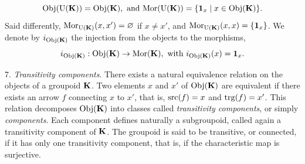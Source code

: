 \begin{article}
  $$%
  \Obj(\Units{\KK}) = \Obj(\KK), \text{ and } \Mor(\Units{\KK}) = \{\id_x \mid x \in \Obj(\KK)\}.
  $$%
  Said differently,
  ${\operatorname{Mor}}_{{\operatorname{U}({\mathbf K})}}(x,x') = \varnothing$ if $x \neq x'$,
  and ${\operatorname{Mor}}_{{\operatorname{U}({\mathbf K})}}(x,x) = \{{\bf 1}_x\}$.
  We denote by $i_{{\operatorname{Obj}}({\mathbf K})}$ the injection from the objects to the morphisms,
  $$%
  i_{\Obj(\KK)} : \Obj(\KK) \to \Mor(\KK), \text{ with } i_{\Obj(\KK)}(x) = \id_x.
  $$%
  
  7. {\em Transitivity components}. There exists a natural equivalence relation on the objects of a groupoid ${\mathbf K}$.
  Two elements $x$ and $x'$ of ${\operatorname{Obj}}({\mathbf K})$ are equivalent if there exists an arrow $f$ connecting $x$ to $x'$,
  that is,
  ${\operatorname{src}}(f) = x$ and ${\operatorname{trg}}(f) = x'$.
  This relation decomposes ${\operatorname{Obj}}({\mathbf K})$ into classes called {\em transitivity components},
  or simply {\em components}.
  Each component defines naturally a subgroupoid,
  called again a transitivity component of ${\mathbf K}$.
  The groupoid is said to be transitive, or connected,
  if it has only one transitivity component,
  that is,
  if the characteristic map is surjective.
  

\end{article}
